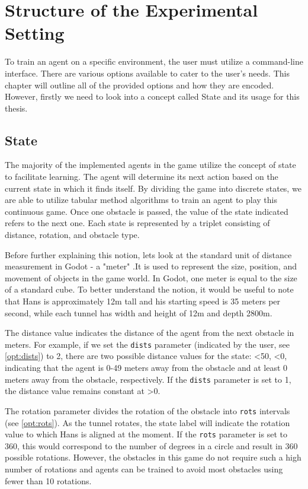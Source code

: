 \chapter{Structure of the Experimental Setting}
\label{agent_code_chapter}
To train an agent on a specific environment, the user must utilize a command-line interface. There are various options available to cater to the user's needs. This chapter will outline all of the provided options and how they are encoded. However, firstly we need to look into a concept called State and its usage for this thesis.

\section{State}
The majority of the implemented agents in the game utilize the concept of state to facilitate learning. The agent will determine its next action based on the current state in which it finds itself. By dividing the game into discrete states, we are able to utilize tabular method algorithms to train an agent to play this continuous game. Once one obstacle is passed, the value of the state indicated refers to the next one. Each state is represented by a triplet consisting of distance, rotation, and obstacle type. 

Before further explaining this notion, lets look at the standard unit of distance measurement in Godot - a "meter" .It is used to represent the size, position, and movement of objects in the game world. In Godot, one meter is equal to the size of a standard cube. To better understand the notion, it would be useful to note that Hans is approximately 12m tall and his starting speed is 35 meters per second, while each tunnel has width and height of 12m and depth 2800m.

The distance value indicates the distance of the agent from the next obstacle in meters. For example, if we set the \texttt{dists} parameter (indicated by the user, see \ref{opt:dists}) to 2, there are two possible distance values for the state: \textless 50, \textless 0, indicating that the agent is 0-49 meters away from the obstacle and at least 0 meters away from the obstacle, respectively. If the \texttt{dists} parameter is set to 1, the distance value remains constant at >0. 

The rotation parameter divides the rotation of the obstacle into \texttt{rots} intervals (see \ref{opt:rots}). As the tunnel rotates, the state label will indicate the rotation value to which Hans is aligned at the moment. If the \texttt{rots} parameter is set to 360, this would correspond to the number of degrees in a circle and result in 360 possible rotations. However, the obstacles in this game do not require such a high number of rotations and agents can be trained to avoid most obstacles using fewer than 10 rotations. 

